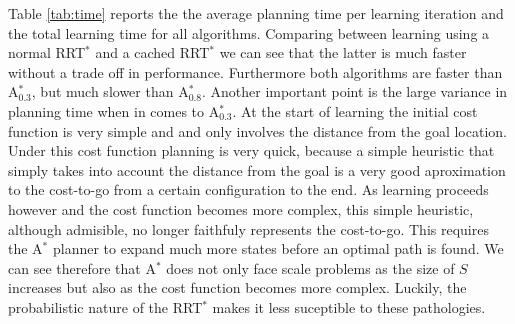 \documentclass{article}  %
\begin{document}
	Table \ref{tab:time} reports the the average planning time per learning iteration and the total learning time for all algorithms. Comparing between learning using a normal RRT$^*$ and a cached RRT$^*$ we can see that the latter is much faster without a trade off in performance. Furthermore both algorithms are faster than A$_{0.3}^*$, but much slower than A$_{0.8}^*$. Another important point is the large variance in planning time when in comes to A$_{0.3}^*$. At the start of learning the initial cost function is very simple and and only involves the distance from the goal location. Under this cost function planning is very quick, because a simple heuristic that simply takes into account the distance from the goal is a very good aproximation to the cost-to-go from a certain configuration to the end. As learning proceeds however and the cost function becomes more complex, this simple heuristic, although admisible, no longer faithfuly represents the cost-to-go. This requires the A$^*$ planner to expand much more states before an optimal path is found. We can see therefore that A$^*$ does not only face scale problems as the size of $S$ increases but also as the cost function becomes more complex. Luckily, the probabilistic nature of the RRT$^*$ makes it less suceptible to these pathologies.  
\end{document}
